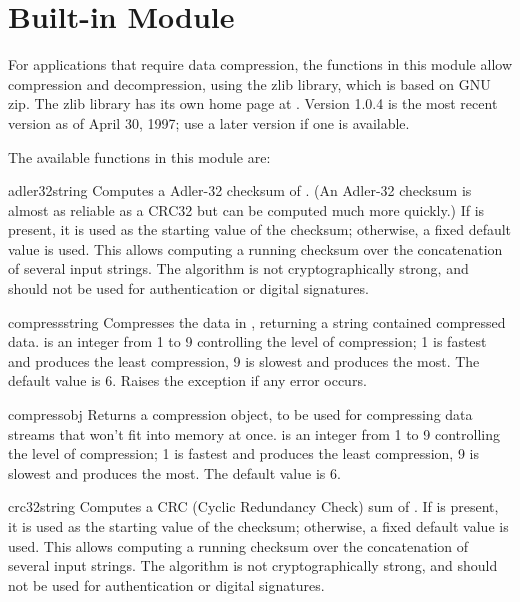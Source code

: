 \section{Built-in Module }

For applications that require data compression, the functions in this
module allow compression and decompression, using the zlib library,
which is based on GNU zip.  The zlib library has its own home page at
.
Version 1.0.4 is the most recent version as of April 30, 1997; use a
later version if one is available.

The available functions in this module are:

\renewcommand{\indexsubitem}{(in module zlib)}
\begin{funcdesc}{adler32}{string}
   Computes a Adler-32 checksum of .  (An Adler-32
   checksum is almost as reliable as a CRC32 but can be computed much
   more quickly.)  If  is present, it is used as the
   starting value of the checksum; otherwise, a fixed default value is
   used.  This allows computing a running checksum over the
   concatenation of several input strings.  The algorithm is not
   cryptographically strong, and should not be used for
   authentication or digital signatures.
\end{funcdesc}

\begin{funcdesc}{compress}{string}
Compresses the data in , returning a string contained
compressed data.   is an integer from 1 to 9 controlling
the level of compression; 1 is fastest and produces the least
compression, 9 is slowest and produces the most.  The default value is
6.  Raises the  exception if any error occurs.
\end{funcdesc}

\begin{funcdesc}{compressobj}{}
Returns a compression object, to be used for compressing data streams
  that won't fit into memory at once.   is an integer from
  1 to 9 controlling the level of compression; 1 is fastest and
  produces the least compression, 9 is slowest and produces the most.
  The default value is 6.
\end{funcdesc}

\begin{funcdesc}{crc32}{string}
   Computes a CRC (Cyclic Redundancy Check) sum of . If
    is present, it is used as the starting value of the
   checksum; otherwise, a fixed default value is used.  This allows
   computing a running checksum over the concatenation of several
   input strings.  The algorithm is not cryptographically strong, and
   should not be used for authentication or digital signatures.
\end{funcdesc}

